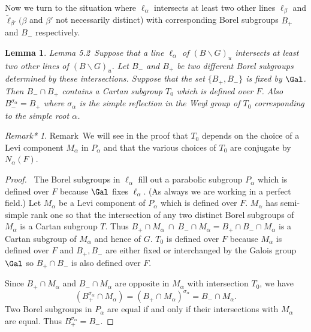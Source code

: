 \documentclass{memo-l}
\newtheorem{lemma}[theorem]{Lemma}
\theoremstyle{definition}
\theoremstyle{remark}
\newtheorem{remark*}{Remark*} %
\numberwithin{section}{chapter}
\numberwithin{equation}{chapter}
\begin{document}
{\medskip}

   Now we turn to the situation where ${\ell}_{{\alpha}}$ intersects at
least two other lines ${\ell}_{{\beta}}$ and $\tilde{\ell} _{{\beta}'}
({\beta}$ and ${\beta}'$ not necessarily distinct) with corresponding Borel
subgroups $B_{+}$ and $B_{-}$ respectively.

\medpagebreak

\begin{lemma}{Lemma 5.2}\ Suppose that a line ${\ell}_{{\alpha}}$ of
$(B\backslash G)_{u}$ intersects at least two other lines of $(B\backslash
G)_{u}$.  Let $B_{-}$ and $B_{+}$ be two different Borel subgroups
determined by these intersections.  Suppose that the set $\{B_{+},B_{-}\}$
is fixed by $\Gal$.  Then $B_{-} \cap B_{+}$ contains a Cartan
subgroup $T_{0}$ which is defined over $F$.  Also $B_-^{\sigma_\alpha} = 
B_{+}$ where ${\sigma}_{{\alpha}}$ is the simple
reflection in the Weyl group of $T_{0}$ corresponding to the simple root
${\alpha}$.
\end{lemma}

\begin{remark*}{Remark}\ We will see in the proof that $T_{0}$ depends on the
choice of a Levi component $M_{{\alpha}}$ in $P_{{\alpha}}$ and that the
various choices of $T_{0}$ are conjugate by $N_{{\alpha}}(F)$.
\end{remark*}


\begin{proof} \ The Borel subgroups in ${\ell}_{{\alpha}}$ fill out a
parabolic subgroup $P_{{\alpha}}$ which is defined over $F$ because
$\Gal$ fixes ${\ell}_{{\alpha}}$.  (As always we are working in a
perfect field.) Let $M_{{\alpha}}$ be a Levi component of $P_{{\alpha}}$
which is defined over $F$.  $M_{{\alpha}}$ has semi-simple rank one so that
the intersection of any two distinct Borel subgroups of $M_{{\alpha}}$ is a
Cartan subgroup $T$.  Thus $B_{+}\cap M_{{\alpha}} \ \cap\ 
B_{-}\cap M_{{\alpha}} = B_{+}\cap B_{-} \cap M_{{\alpha}}$ is a Cartan
subgroup of $M_{{\alpha}}$ and hence of $G$.  $T_{0}$ is defined over $F$
because $M_{{\alpha}}$ is defined over $F$ and $B_{+},B_{-}$ are either
fixed or interchanged by the Galois group $\Gal$ so
$B_{+} \cap B_{-}$ is also defined over $F$.

   Since $B_{+} \cap M_{{\alpha}}$ and $B_{-} \cap M_{{\alpha}}$ are
opposite in $M_{{\alpha}}$ with intersection $T_{0}$, we have 
$$(B_{+}^{{\sigma}_{{\alpha}}}  \cap  M_{{\alpha}}) = (B_{+}  \cap  
M_{{\alpha}})^{{\sigma}_{{\alpha}}} = B_{-}  \cap  M_{{\alpha}}.$$  Two Borel subgroups
in $P_{{\alpha}}$ are equal if and only if their intersections with
$M_{{\alpha}}$ are equal.  Thus $B_{+}^{{\sigma}_{{\alpha}}} =
B_{-}$.
\end{proof} 
\end{document}
